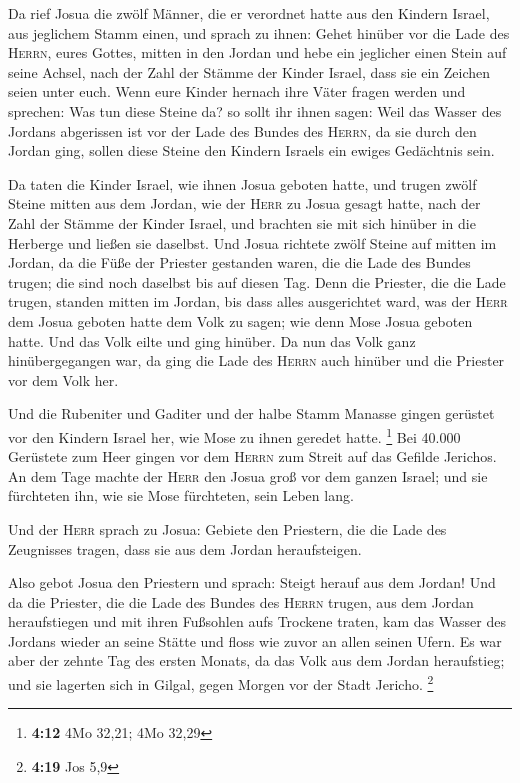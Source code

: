  Da rief Josua die zwölf Männer, die er verordnet hatte
aus den Kindern Israel, aus jeglichem Stamm einen,  und
sprach zu ihnen: Gehet hinüber vor die Lade des \textsc{Herrn}, eures
Gottes, mitten in den Jordan und hebe ein jeglicher einen Stein auf
seine Achsel, nach der Zahl der Stämme der Kinder Israel, 
dass sie ein Zeichen seien unter euch. Wenn eure Kinder hernach ihre
Väter fragen werden und sprechen: Was tun diese Steine da?
 so sollt ihr ihnen sagen: Weil das Wasser des Jordans
abgerissen ist vor der Lade des Bundes des \textsc{Herrn}, da sie durch
den Jordan ging, sollen diese Steine den Kindern Israels ein ewiges
Gedächtnis sein.

 Da taten die Kinder Israel, wie ihnen Josua geboten
hatte, und trugen zwölf Steine mitten aus dem Jordan, wie der
\textsc{Herr} zu Josua gesagt hatte, nach der Zahl der Stämme der Kinder
Israel, und brachten sie mit sich hinüber in die Herberge und ließen sie
daselbst.  Und Josua richtete zwölf Steine auf mitten im
Jordan, da die Füße der Priester gestanden waren, die die Lade des
Bundes trugen; die sind noch daselbst bis auf diesen Tag.
 Denn die Priester, die die Lade trugen, standen mitten
im Jordan, bis dass alles ausgerichtet ward, was der \textsc{Herr} dem
Josua geboten hatte dem Volk zu sagen; wie denn Mose Josua geboten
hatte. Und das Volk eilte und ging hinüber.  Da nun das
Volk ganz hinübergegangen war, da ging die Lade des \textsc{Herrn} auch
hinüber und die Priester vor dem Volk her.

 Und die Rubeniter und Gaditer und der halbe Stamm
Manasse gingen gerüstet vor den Kindern Israel her, wie Mose zu ihnen
geredet hatte. \footnote{\textbf{4:12} 4Mo 32,21; 4Mo 32,29}
 Bei 40.000 Gerüstete zum Heer gingen vor dem
\textsc{Herrn} zum Streit auf das Gefilde Jerichos.  An
dem Tage machte der \textsc{Herr} den Josua groß vor dem ganzen Israel;
und sie fürchteten ihn, wie sie Mose fürchteten, sein Leben lang.

 Und der \textsc{Herr} sprach zu Josua: 
Gebiete den Priestern, die die Lade des Zeugnisses tragen, dass sie aus
dem Jordan heraufsteigen.

 Also gebot Josua den Priestern und sprach: Steigt herauf
aus dem Jordan!  Und da die Priester, die die Lade des
Bundes des \textsc{Herrn} trugen, aus dem Jordan heraufstiegen und mit
ihren Fußsohlen aufs Trockene traten, kam das Wasser des Jordans wieder
an seine Stätte und floss wie zuvor an allen seinen Ufern.
 Es war aber der zehnte Tag des ersten Monats, da das
Volk aus dem Jordan heraufstieg; und sie lagerten sich in Gilgal, gegen
Morgen vor der Stadt Jericho. \footnote{\textbf{4:19} Jos 5,9}

